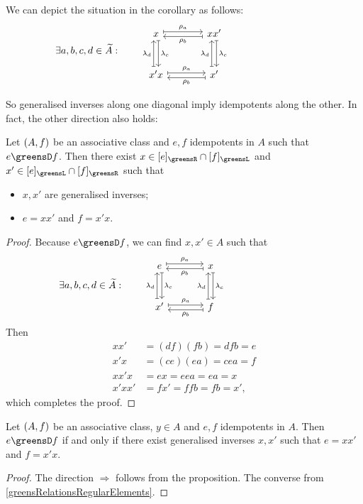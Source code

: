 We can depict the situation in the corollary as follows:
\[ \hspace{-8.4em} \exists a,b,c,d \in \widetilde{A}: \qquad \begin{tikzcd}[sep=large]
x \ar[r, maps to, shift left, "\rho_a"] \ar[d, maps to, shift left, "\lambda_c"] & xx' \ar[l, maps to, shift left, "\rho_b"] \ar[d, maps to, shift left, "\lambda_c"] \\
x'x \ar[u, maps to, shift left, "\lambda_d"] \ar[r, maps to, shift left, "\rho_a"] & x' \ar[u, maps to, shift left, "\lambda_d"] \ar[l, maps to, shift left, "\rho_b"]
\end{tikzcd} \]

So generalised inverses along one diagonal imply idempotents along the other. In fact, the other direction also holds:
\begin{proposition}
Let $\left( A, f \right)$ be an associative class and $e,f$ idempotents in $A$ such that $e\greensD f$. Then there exist $x\in [e]_\greensR\cap [f]_\greensL$ and $x'\in [e]_\greensL\cap [f]_\greensR$ such that
\begin{itemize}
\item $x,x'$ are generalised inverses;
\item $e = xx'$ and $f = x'x$.
\end{itemize}
\end{proposition}
\begin{proof}
Because $e\greensD f$, we can find $x,x'\in A$ such that
\[ \hspace{-8.4em} \exists a,b,c,d \in \widetilde{A}: \qquad \begin{tikzcd}[sep=large]
e \ar[r, maps to, shift left, "\rho_a"] \ar[d, maps to, shift left, "\lambda_c"] & x \ar[l, maps to, shift left, "\rho_b"] \ar[d, maps to, shift left, "\lambda_c"] \\
x' \ar[u, maps to, shift left, "\lambda_d"] \ar[r, maps to, shift left, "\rho_a"] & f \ar[u, maps to, shift left, "\lambda_d"] \ar[l, maps to, shift left, "\rho_b"]
\end{tikzcd} \]
Then
\begin{align*}
xx' &= (df)(fb) = dfb = e \\
x'x &= (ce)(ea) = cea = f \\
xx'x &= ex = eea = ea = x \\
x'xx' &= fx' = ffb = fb = x',
\end{align*}
which completes the proof.
\end{proof}
\begin{corollary}
Let $\left( A, f \right)$ be an associative class, $y\in A$ and $e,f$ idempotents in $A$. Then $e\greensD f$ \textup{if and only if} there exist generalised inverses $x,x'$ such that $e = xx'$ and $f = x'x$.
\end{corollary}
\begin{proof}
The direction $\Rightarrow$ follows from the proposition. The converse from \ref{greensRelationsRegularElements}.
\end{proof}

